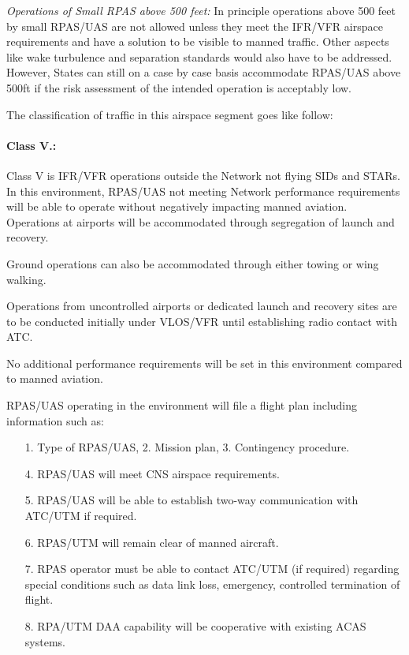 \emph{Operations of Small RPAS above 500 feet:} In principle operations above 500 feet by small RPAS/UAS are not allowed unless they meet the IFR/VFR airspace requirements and have a solution to be visible to manned traffic. Other aspects like wake turbulence and separation standards would also have to be addressed. However, States can still on a case by case basis accommodate RPAS/UAS above 500ft if the risk assessment of the intended operation is acceptably low.

\noindent The classification of traffic in this airspace segment goes like follow:

\paragraph{Class V.:} Class V is IFR/VFR operations outside the Network not flying SIDs and STARs. In this environment, RPAS/UAS not meeting Network performance requirements will be able to operate without negatively impacting manned aviation. Operations at airports will be accommodated through segregation of launch and recovery.

    Ground operations can also be accommodated through either towing or wing walking.

    Operations from uncontrolled airports or dedicated launch and recovery sites are to be conducted initially under VLOS/VFR until establishing radio contact with ATC.

    No additional performance requirements will be set in this environment compared to manned aviation.
    
    RPAS/UAS operating in the environment will file a flight plan including information such as:
    \begin{itemize}
        \item[1.] Type of RPAS/UAS, 2. Mission plan, 3. Contingency procedure.
        
        \item[4.] RPAS/UAS will meet CNS airspace requirements.
        
        \item[5.] RPAS/UAS will be able to establish two-way communication with ATC/UTM if required.
        
        \item[6.]  RPAS/UTM will remain clear of manned aircraft.
        
        \item[7.]  RPAS operator must be able to contact ATC/UTM (if required) regarding special conditions such as data link loss, emergency, controlled termination of flight.
        
        \item[8.] RPA/UTM DAA capability will be cooperative with existing ACAS systems.
    \end{itemize}
    
